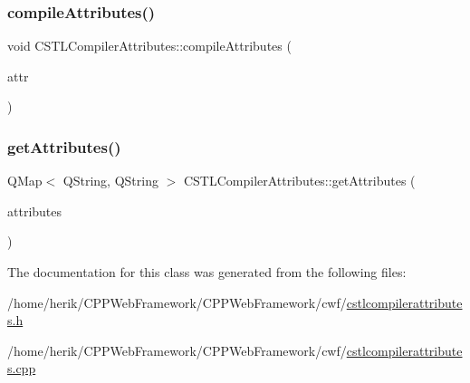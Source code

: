 \mbox{\label{class_c_s_t_l_compiler_attributes_a1376447033a4bfcceb1b1d27935d6d06}} 
\subsubsection{\texorpdfstring{compile\+Attributes()}{compileAttributes()}}
{\footnotesize\ttfamily void C\+S\+T\+L\+Compiler\+Attributes\+::compile\+Attributes (\begin{DoxyParamCaption}\item[{Q\+Map$<$ Q\+String, Q\+String $>$ \&}]{attr }\end{DoxyParamCaption})}

\mbox{\label{class_c_s_t_l_compiler_attributes_aaccef26836cdd8e2c7974b1a1e70b6c0}} 
\subsubsection{\texorpdfstring{get\+Attributes()}{getAttributes()}}
{\footnotesize\ttfamily Q\+Map$<$ Q\+String, Q\+String $>$ C\+S\+T\+L\+Compiler\+Attributes\+::get\+Attributes (\begin{DoxyParamCaption}\item[{const Q\+Xml\+Stream\+Attributes \&}]{attributes }\end{DoxyParamCaption})}



The documentation for this class was generated from the following files\+:\begin{DoxyCompactItemize}
\item 
/home/herik/\+C\+P\+P\+Web\+Framework/\+C\+P\+P\+Web\+Framework/cwf/\hyperlink{cstlcompilerattributes_8h}{cstlcompilerattributes.\+h}\item 
/home/herik/\+C\+P\+P\+Web\+Framework/\+C\+P\+P\+Web\+Framework/cwf/\hyperlink{cstlcompilerattributes_8cpp}{cstlcompilerattributes.\+cpp}\end{DoxyCompactItemize}
